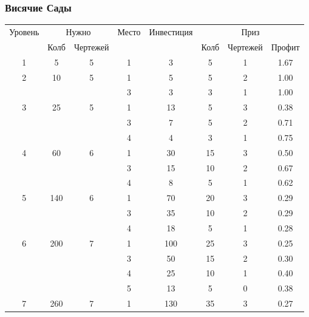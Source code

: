 \subsubsection{Висячие Сады}

\begin{longtable}[c]{|c|c|c|c|c|c|c|c|}
    \hline
    \multirow{ 2}{*}{\small Уровень} &
    \multicolumn{2}{|c|}{\small Нужно} &
    \multirow{ 2}{*}{\small Место} & 
    \multirow{ 2}{*}{\small Инвестиция} & 
    \multicolumn{3}{|c|}{\small Приз} \\\cline{2-3}\cline{6-8}
    &
    {\small Колб} & 
    {\small Чертежей} & 
    & &
    {\small Колб} & 
    {\small Чертежей} & 
    {\small Профит}
    \\\hline\endhead
    \multirow{1}{*}{1} & \multirow{1}{*}{5} & \multirow{1}{*}{5} & 1 & 3 & 5 & 1 & 1.67 \\\hline
    \multirow{2}{*}{2} & \multirow{2}{*}{10} & \multirow{2}{*}{5} & 1 & 5 & 5 & 2 & 1.00 \\\cline{4-8}
    & & & 3 & 3 & 3 & 1 & 1.00 \\\hline
    \multirow{3}{*}{3} & \multirow{3}{*}{25} & \multirow{3}{*}{5} & 1 & 13 & 5 & 3 & 0.38 \\\cline{4-8}
    & & & 3 & 7 & 5 & 2 & 0.71 \\\cline{4-8}
    & & & 4 & 4 & 3 & 1 & 0.75 \\\hline
    \multirow{3}{*}{4} & \multirow{3}{*}{60} & \multirow{3}{*}{6} & 1 & 30 & 15 & 3 & 0.50 \\\cline{4-8}
    & & & 3 & 15 & 10 & 2 & 0.67 \\\cline{4-8}
    & & & 4 & 8 & 5 & 1 & 0.62 \\\hline
    \multirow{3}{*}{5} & \multirow{3}{*}{140} & \multirow{3}{*}{6} & 1 & 70 & 20 & 3 & 0.29 \\\cline{4-8}
    & & & 3 & 35 & 10 & 2 & 0.29 \\\cline{4-8}
    & & & 4 & 18 & 5 & 1 & 0.28 \\\hline
    \multirow{4}{*}{6} & \multirow{4}{*}{200} & \multirow{4}{*}{7} & 1 & 100 & 25 & 3 & 0.25 \\\cline{4-8}
    & & & 3 & 50 & 15 & 2 & 0.30 \\\cline{4-8}
    & & & 4 & 25 & 10 & 1 & 0.40 \\\cline{4-8}
    & & & 5 & 13 & 5 & 0 & 0.38 \\\hline
    \multirow{4}{*}{7} & \multirow{4}{*}{260} & \multirow{4}{*}{7} & 1 & 130 & 35 & 3 & 0.27 \\\cline{4-8}

\end{longtable}
